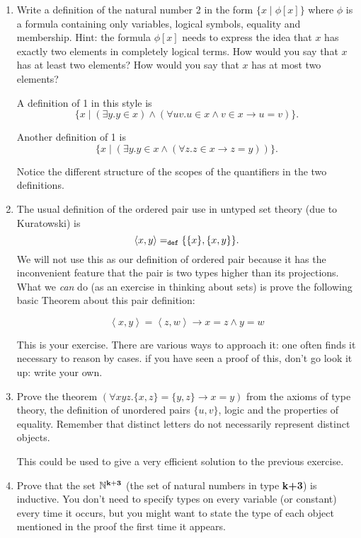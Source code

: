 \documentclass[12pt]{book}
\begin{document}
\begin{enumerate}

\item Write a definition of the natural number 2 in the form
$\{x \mid \phi[x]\}$ where $\phi$ is a formula containing only
variables, logical symbols, equality and membership.  Hint: the
formula $\phi[x]$ needs to express the idea that $x$ has exactly two
elements in completely logical terms.  How would you say that $x$
has at least two elements?  How would you say that $x$ has at most two elements?

A definition of 1 in this style is $$\{x \mid (\exists y.y \in x)
\wedge (\forall uv.u \in x \wedge v \in x \rightarrow u=v)\}.$$

Another definition of 1 is $$\{x \mid (\exists y.y \in x \wedge (\forall z.z\in x \rightarrow z=y))\}.$$

Notice the different structure of the scopes of the quantifiers in the
two definitions.

\item The usual definition of the ordered pair use in untyped set
theory (due to Kuratowski) is $$\left<x,y\right> =_{\tt def}
\{\{x\},\{x,y\}\}.$$ We will not use this as our definition of ordered
pair because it has the inconvenient feature that the pair is two
types higher than its projections.  What we {\em can\/} do (as an
exercise in thinking about sets) is prove the following basic Theorem
about this pair definition:

$$\left<x,y\right>=\left<z,w\right>\rightarrow x=z \wedge y=w$$

This is your exercise.  There are various ways to approach it: one
often finds it necessary to reason by cases.  if you have seen a proof
of this, don't go look it up: write your own.

\item
Prove the theorem $(\forall xyz.\{x,z\} = \{y,z\} \rightarrow x=y)$
from the axioms of type theory, the definition of unordered pairs
$\{u,v\}$, logic and the properties of equality.  Remember that
distinct letters do not necessarily represent distinct objects.

This could be used to give a very efficient solution to the previous
exercise.


\item  
Prove that the set $\mathbb N^{\bf k+3}$ (the set of natural numbers
in type {\bf k+3}) is inductive.  You don't need to specify types on
every variable (or constant) every time it occurs, but you might want
to state the type of each object mentioned in the proof the first time
it appears.


\end{enumerate}
\end{document}
